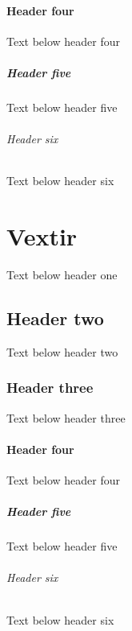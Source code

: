 \documentclass[a4paper,10pt,icelandic]{sphinxmanual}
\begin{document}
\subsubsection{Header four}
\label{\detokenize{fjarmalastjornun/index:header-four}}
\sphinxAtStartPar
Text below header four


\paragraph{Header five}
\label{\detokenize{fjarmalastjornun/index:header-five}}
\sphinxAtStartPar
Text below header five


\subparagraph{Header six}
\label{\detokenize{fjarmalastjornun/index:header-six}}
\sphinxAtStartPar
Text below header six

\sphinxstepscope


\chapter{Vextir}
\label{\detokenize{vextir/index:vextir}}\label{\detokenize{vextir/index::doc}}
\sphinxAtStartPar
Text below header one


\section{Header two}
\label{\detokenize{vextir/index:header-two}}
\sphinxAtStartPar
Text below header two


\subsection{Header three}
\label{\detokenize{vextir/index:header-three}}
\sphinxAtStartPar
Text below header three


\subsubsection{Header four}
\label{\detokenize{vextir/index:header-four}}
\sphinxAtStartPar
Text below header four


\paragraph{Header five}
\label{\detokenize{vextir/index:header-five}}
\sphinxAtStartPar
Text below header five


\subparagraph{Header six}
\label{\detokenize{vextir/index:header-six}}
\sphinxAtStartPar
Text below header six
\end{document}
